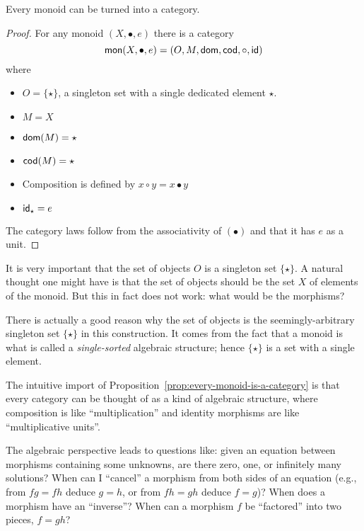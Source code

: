 \begin{construction} \label{prop:every-monoid-is-a-category}
  Every monoid can be turned into a category.
\end{construction}
\begin{proof}
  For any monoid \((X,\bullet,e)\) there is a category
  \[
    \mathsf{mon}(X,\bullet,e) = (O,M,\operatorname{\mathsf{dom}},\operatorname{\mathsf{cod}},\circ,\mathsf{id})
  \]
  where
  \begin{itemize}
  \item \(O = \{\star\}\), a singleton set with a single dedicated element \(\star\).
  \item \(M = X\)
  \item \(\operatorname{\mathsf{dom}}(M) = \star\)
  \item \(\operatorname{\mathsf{cod}}(M) = \star\)
  \item Composition is defined by \(x \circ y = x \bullet y\)
  \item \(\mathsf{id}_\star = e\)
  \end{itemize}
  The category laws follow from the associativity of \((\bullet)\)
  and that it has \(e\) as a unit.
\end{proof}
\begin{note}
  It is very important that the set of objects \(O\) is a singleton set \(\{\star\}\).
  A natural thought one might have is that the set of objects should be the set \(X\) of elements of the monoid.
  But this in fact does not work: what would be the morphisms?

  There is actually a good reason why the set of objects is the seemingly-arbitrary singleton set \(\{\star\}\) in this construction.
  It comes from the fact that a monoid is what is called a \emph{single-sorted} algebraic structure; hence \(\{\star\}\)
  is a set with a single element.
\end{note}
The intuitive import of
Proposition~\ref{prop:every-monoid-is-a-category} is that
every category can be thought of as a kind of algebraic structure,
where composition is like ``multiplication''
and identity morphisms are like ``multiplicative units''.

The algebraic perspective leads to questions like:
given an equation between morphisms containing some unknowns,
are there zero, one, or infinitely many solutions?
When can I ``cancel'' a morphism from both sides of an equation (e.g., from \(fg = fh\) deduce \(g=h\),
or from \(fh = gh\) deduce \(f=g\))?
When does a morphism have an ``inverse''?
When can a morphism \(f\) be ``factored'' into two pieces, \(f = gh\)?



